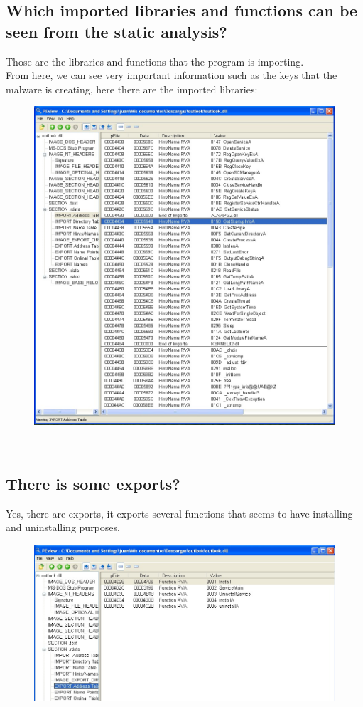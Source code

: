 \documentclass[12pt,letter]{article} %
\begin{document}
        \subsection{Which imported libraries and functions can be seen from the static analysis?}
            Those are the libraries and functions that the program is importing.
            \\
            From here, we can see very important information such as the keys
            that the malware is creating, here there are the imported
            libraries:
            \begin{figure}[h!]
            	\centering
            \includegraphics[width=0.5\linewidth]{imports2.jpeg}
            \end{figure}
		$ $\\
		\pagebreak
        \subsection{There is some exports?}
            Yes, there are exports, it exports several functions  that seems to
            have installing and uninstalling purposes.

            \begin{figure}[h!]
        	    \includegraphics[width=0.8\linewidth]{exports1.jpeg}
            \end{figure}
			 \pagebreak
\end{document}
